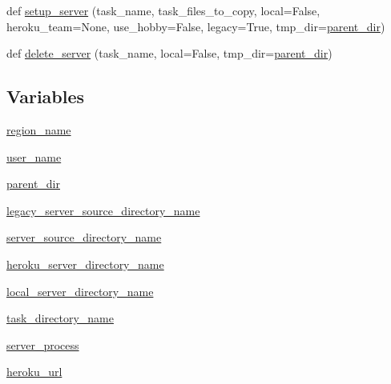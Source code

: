 \begin{DoxyCompactItemize}
\item 
def \hyperlink{namespaceparlai_1_1mturk_1_1core_1_1legacy__2018_1_1server__utils_af65b71753d79d3513be6d4c890853a4d}{setup\+\_\+server} (task\+\_\+name, task\+\_\+files\+\_\+to\+\_\+copy, local=False, heroku\+\_\+team=None, use\+\_\+hobby=False, legacy=True, tmp\+\_\+dir=\hyperlink{namespaceparlai_1_1mturk_1_1core_1_1legacy__2018_1_1server__utils_a6a871d2f8e5c0768a82ab8fa2e7fadae}{parent\+\_\+dir})
\item 
def \hyperlink{namespaceparlai_1_1mturk_1_1core_1_1legacy__2018_1_1server__utils_a034c68a129a95ca47005fc7f81bdfc09}{delete\+\_\+server} (task\+\_\+name, local=False, tmp\+\_\+dir=\hyperlink{namespaceparlai_1_1mturk_1_1core_1_1legacy__2018_1_1server__utils_a6a871d2f8e5c0768a82ab8fa2e7fadae}{parent\+\_\+dir})
\end{DoxyCompactItemize}
\subsection*{Variables}
\begin{DoxyCompactItemize}
\item 
\hyperlink{namespaceparlai_1_1mturk_1_1core_1_1legacy__2018_1_1server__utils_a40e6958bc1a53ac5964286661e8522cf}{region\+\_\+name}
\item 
\hyperlink{namespaceparlai_1_1mturk_1_1core_1_1legacy__2018_1_1server__utils_a5cf85a959193c37dc81be36166b3e122}{user\+\_\+name}
\item 
\hyperlink{namespaceparlai_1_1mturk_1_1core_1_1legacy__2018_1_1server__utils_a6a871d2f8e5c0768a82ab8fa2e7fadae}{parent\+\_\+dir}
\item 
\hyperlink{namespaceparlai_1_1mturk_1_1core_1_1legacy__2018_1_1server__utils_a355cea1ef117cdeb48313cef8fa060bd}{legacy\+\_\+server\+\_\+source\+\_\+directory\+\_\+name}
\item 
\hyperlink{namespaceparlai_1_1mturk_1_1core_1_1legacy__2018_1_1server__utils_ac0de37d4c9b9c6c14a0b3604ed6e85bc}{server\+\_\+source\+\_\+directory\+\_\+name}
\item 
\hyperlink{namespaceparlai_1_1mturk_1_1core_1_1legacy__2018_1_1server__utils_a7d771587f098e0e4e545182707f4eb60}{heroku\+\_\+server\+\_\+directory\+\_\+name}
\item 
\hyperlink{namespaceparlai_1_1mturk_1_1core_1_1legacy__2018_1_1server__utils_ace1de7f407393e5f2e7b8d0f8ab2b1e5}{local\+\_\+server\+\_\+directory\+\_\+name}
\item 
\hyperlink{namespaceparlai_1_1mturk_1_1core_1_1legacy__2018_1_1server__utils_afe46fac42666443281564d0edc83b2c8}{task\+\_\+directory\+\_\+name}
\item 
\hyperlink{namespaceparlai_1_1mturk_1_1core_1_1legacy__2018_1_1server__utils_a4609fd8d80c5d5567e2b597e568f6f52}{server\+\_\+process}
\item 
\hyperlink{namespaceparlai_1_1mturk_1_1core_1_1legacy__2018_1_1server__utils_adf3edaded0fe67016e84220d39c99778}{heroku\+\_\+url}
\end{DoxyCompactItemize}


